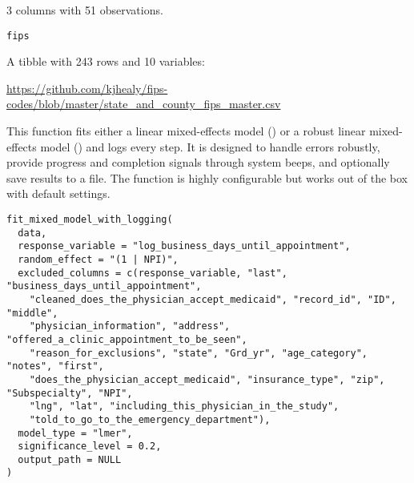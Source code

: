 \documentclass[a4paper]{book}
\begin{document}
%
\begin{Description}
3 columns with 51 observations.
\end{Description}
%
\begin{Usage}
\begin{verbatim}
fips
\end{verbatim}
\end{Usage}
%
\begin{Format}
A tibble with 243 rows and 10 variables:
\begin{description}


\end{description}

\end{Format}
%
\begin{Source}
\url{https://github.com/kjhealy/fips-codes/blob/master/state_and_county_fips_master.csv}
\end{Source}
%
\begin{Description}
This function fits either a linear mixed-effects model () or a robust linear mixed-effects model ()
and logs every step. It is designed to handle errors robustly, provide progress and completion signals through system beeps, and
optionally save results to a file. The function is highly configurable but works out of the box with default settings.
\end{Description}
%
\begin{Usage}
\begin{verbatim}
fit_mixed_model_with_logging(
  data,
  response_variable = "log_business_days_until_appointment",
  random_effect = "(1 | NPI)",
  excluded_columns = c(response_variable, "last", "business_days_until_appointment",
    "cleaned_does_the_physician_accept_medicaid", "record_id", "ID", "middle",
    "physician_information", "address", "offered_a_clinic_appointment_to_be_seen",
    "reason_for_exclusions", "state", "Grd_yr", "age_category", "notes", "first",
    "does_the_physician_accept_medicaid", "insurance_type", "zip", "Subspecialty", "NPI",
    "lng", "lat", "including_this_physician_in_the_study",
    "told_to_go_to_the_emergency_department"),
  model_type = "lmer",
  significance_level = 0.2,
  output_path = NULL
)
\end{verbatim}
\end{Usage}
%
\end{document}
